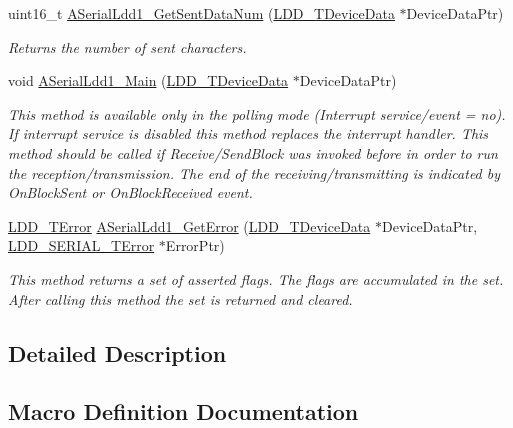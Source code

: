 \begin{DoxyCompactItemize}
uint16\+\_\+t \hyperlink{group___a_serial_ldd1__module_ga661a5b0bc479cdfd9fea721ba056b71d}{A\+Serial\+Ldd1\+\_\+\+Get\+Sent\+Data\+Num} (\hyperlink{group___p_e___types__module_gac5cf1362f1f0e3a2ce71b1bf2276d091}{L\+D\+D\+\_\+\+T\+Device\+Data} $\ast$Device\+Data\+Ptr)
\begin{DoxyCompactList}\small\item\em Returns the number of sent characters. \end{DoxyCompactList}\item 
void \hyperlink{group___a_serial_ldd1__module_ga66631837c366735ce64a39fb7a151499}{A\+Serial\+Ldd1\+\_\+\+Main} (\hyperlink{group___p_e___types__module_gac5cf1362f1f0e3a2ce71b1bf2276d091}{L\+D\+D\+\_\+\+T\+Device\+Data} $\ast$Device\+Data\+Ptr)
\begin{DoxyCompactList}\small\item\em This method is available only in the polling mode (Interrupt service/event = \textquotesingle{}no\textquotesingle{}). If interrupt service is disabled this method replaces the interrupt handler. This method should be called if Receive/\+Send\+Block was invoked before in order to run the reception/transmission. The end of the receiving/transmitting is indicated by On\+Block\+Sent or On\+Block\+Received event. \end{DoxyCompactList}\item 
\hyperlink{group___p_e___types__module_ga24c2b045fd04e79e85f261ce4df35588}{L\+D\+D\+\_\+\+T\+Error} \hyperlink{group___a_serial_ldd1__module_gaac860ccc68e9f89fb25d97ae0c56bd87}{A\+Serial\+Ldd1\+\_\+\+Get\+Error} (\hyperlink{group___p_e___types__module_gac5cf1362f1f0e3a2ce71b1bf2276d091}{L\+D\+D\+\_\+\+T\+Device\+Data} $\ast$Device\+Data\+Ptr, \hyperlink{group___p_e___types__module_ga3bd5d57e02458ce220540d0ad0462e06}{L\+D\+D\+\_\+\+S\+E\+R\+I\+A\+L\+\_\+\+T\+Error} $\ast$Error\+Ptr)
\begin{DoxyCompactList}\small\item\em This method returns a set of asserted flags. The flags are accumulated in the set. After calling this method the set is returned and cleared. \end{DoxyCompactList}\end{DoxyCompactItemize}


\subsection{Detailed Description}


\subsection{Macro Definition Documentation}
